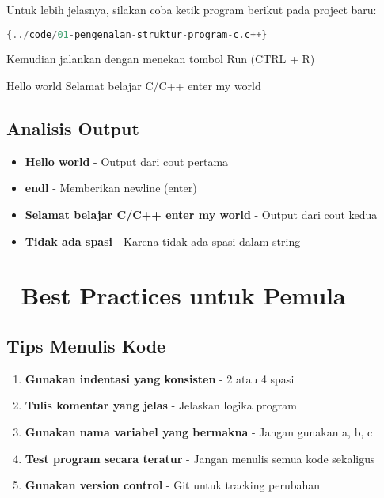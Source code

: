 Untuk lebih jelasnya, silakan coba ketik program berikut pada project baru:

\begin{lstlisting}[language=c++, caption=Struktur program C++]{../code/01-pengenalan-struktur-program-c.c++}
\end{lstlisting}

Kemudian jalankan dengan menekan tombol Run (CTRL + R)

\begin{lcverbatim}
Hello world
Selamat belajar C/C++ enter my world
\end{lcverbatim}

\subsection{Analisis Output}

\begin{itemize}
\item \textbf{Hello world} - Output dari cout pertama
\item \textbf{endl} - Memberikan newline (enter)
\item \textbf{Selamat belajar C/C++ enter my world} - Output dari cout kedua
\item \textbf{Tidak ada spasi} - Karena tidak ada spasi dalam string
\end{itemize}

\section{🎯 Best Practices untuk Pemula}

\subsection{Tips Menulis Kode}

\begin{enumerate}
\item \textbf{Gunakan indentasi yang konsisten} - 2 atau 4 spasi
\item \textbf{Tulis komentar yang jelas} - Jelaskan logika program
\item \textbf{Gunakan nama variabel yang bermakna} - Jangan gunakan a, b, c
\item \textbf{Test program secara teratur} - Jangan menulis semua kode sekaligus
\item \textbf{Gunakan version control} - Git untuk tracking perubahan
\end{enumerate}

